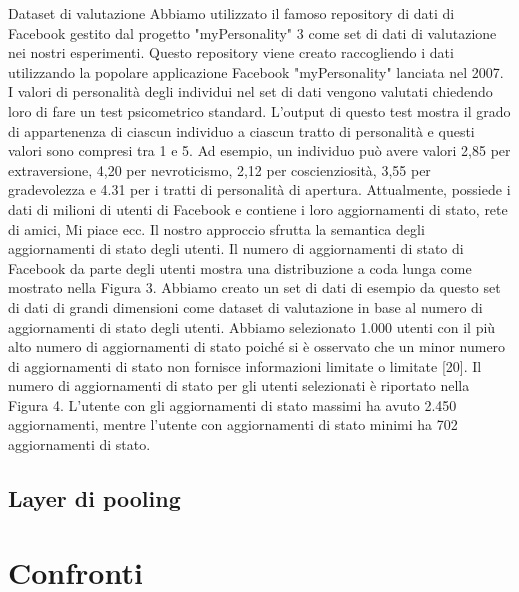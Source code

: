 Dataset di valutazione
Abbiamo utilizzato il famoso repository di dati di Facebook gestito dal progetto "myPersonality" 3 come set di dati di valutazione nei nostri esperimenti. Questo repository viene creato raccogliendo i dati utilizzando la popolare applicazione Facebook "myPersonality" lanciata nel 2007. I valori di personalità degli individui nel set di dati vengono valutati chiedendo loro di fare un test psicometrico standard. L'output di questo test mostra il grado di appartenenza di ciascun individuo a ciascun tratto di personalità e questi valori sono compresi tra 1 e 5. Ad esempio, un individuo può avere valori 2,85 per extraversione, 4,20 per nevroticismo, 2,12 per coscienziosità, 3,55 per gradevolezza e 4.31 per i tratti di personalità di apertura. Attualmente, possiede i dati di milioni di utenti di Facebook e contiene i loro aggiornamenti di stato, rete di amici, Mi piace ecc.
Il nostro approccio sfrutta la semantica degli aggiornamenti di stato degli utenti. Il numero di aggiornamenti di stato di Facebook da parte degli utenti mostra una distribuzione a coda lunga come mostrato nella Figura 3. Abbiamo creato un set di dati di esempio da questo set di dati di grandi dimensioni come dataset di valutazione in base al numero di aggiornamenti di stato degli utenti. Abbiamo selezionato 1.000 utenti con il più alto numero di aggiornamenti di stato poiché si è osservato che un minor numero di aggiornamenti di stato non fornisce informazioni limitate o limitate [20]. Il numero di aggiornamenti di stato per gli utenti selezionati è riportato nella Figura 4. L'utente con gli aggiornamenti di stato massimi ha avuto 2.450 aggiornamenti, mentre l'utente con aggiornamenti di stato minimi ha 702 aggiornamenti di stato.



\subsection{Layer di pooling}
\label{subsec:layermp}


\section{Confronti}
\label{sec:confronti}